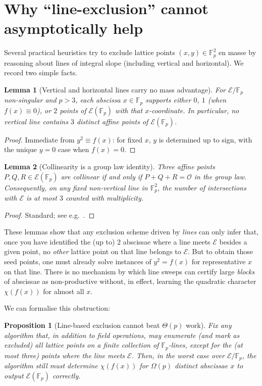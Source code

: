 \documentclass[11pt]{article}
\newtheorem{lemma}{Lemma}
\newtheorem{proposition}{Proposition}
\newcommand{\Fp}{\mathbb{F}_p}
\newcommand{\E}{\mathcal{E}}
\begin{document}
\section*{Why ``line-exclusion'' cannot asymptotically help}

Several practical heuristics try to exclude lattice points $(x,y)\in\Fp^2$ en masse by reasoning about lines of integral slope (including vertical and horizontal). We record two simple facts.

\begin{lemma}[Vertical and horizontal lines carry no mass advantage]\label{lem:vh}
For $\E/\Fp$ non-singular and $p>3$, each abscissa $x\in\Fp$ supports either $0$, $1$ (when $f(x)\equiv 0$), or $2$ points of $\E(\Fp)$ with that $x$-coordinate. In particular, no vertical line contains $3$ distinct affine points of $\E(\Fp)$.
\end{lemma}

\begin{proof}
Immediate from $y^2\equiv f(x)$: for fixed $x$, $y$ is determined up to sign, with the unique $y=0$ case when $f(x)=0$.
\end{proof}

\begin{lemma}[Collinearity is a group law identity]\label{lem:collinear}
Three affine points $P,Q,R\in \E(\Fp)$ are collinear if and only if $P+Q+R=\mathcal{O}$ in the group law. Consequently, on any fixed non-vertical line in $\Fp^2$, the number of intersections with $\E$ is at most $3$ counted with multiplicity.
\end{lemma}

\begin{proof}
Standard; see e.g.\ \cite[Ch.~III]{SilvermanTate}.
\end{proof}

These lemmas show that any exclusion scheme driven by \emph{lines} can only infer that, once you have identified the (up to) $2$ abscissae where a line meets $\E$ besides a given point, no \emph{other} lattice point on that line belongs to $\E$.
But to obtain those seed points, one must already solve instances of $y^2=f(x)$ for representative $x$ on that line. There is no mechanism by which line sweeps can certify large \emph{blocks} of abscissae as non-productive without, in effect, learning the quadratic character $\chi(f(x))$ for almost all $x$.

We can formalise this obstruction:

\begin{proposition}[Line-based exclusion cannot beat $\Theta(p)$ work]\label{prop:lines}
Fix any algorithm that, in addition to field operations, may enumerate (and mark as excluded) all lattice points on a finite collection of $\Fp$-lines, except for the (at most three) points where the line meets $\E$.
Then, in the worst case over $\E/\Fp$, the algorithm still must determine $\chi(f(x))$ for $\Omega(p)$ distinct abscissae $x$ to output $\E(\Fp)$ correctly.
\end{proposition}
\end{document}
